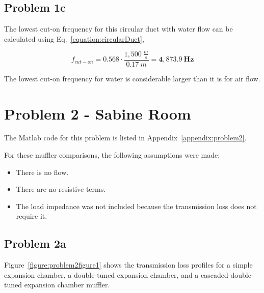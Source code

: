 \vspace{-0.25cm}
\subsection*{Problem 1c}

The lowest cut-on frequency for this circular duct with water flow can be calculated using Eq.~\ref{equation:circularDuct},

\vspace{-0.25cm}
\begin{equation*}
    f_{cut-on} = 0.568 \cdot \frac{ 1,500~\frac{m}{s} }{ 0.17~m } = \boldsymbol{4,873.9~Hz}
\end{equation*}

\vspace{0.25cm}
The lowest cut-on frequency for water is considerable larger than it is for air flow.









\newpage
\section*{Problem 2 - Sabine Room}

The Matlab code for this problem is listed in Appendix~\ref{appendix:problem2}.

\vspace{0.25cm}
For these muffler comparisons, the following assumptions were made:

\begin{itemize}
  \item There is no flow.
  \item There are no resistive terms.
  \item The load impedance was not included because the transmission loss does not require it.
\end{itemize}


\vspace{-0.25cm}
\subsection*{Problem 2a}

\vspace{0.25cm}
Figure~\ref{figure:problem2figure1} shows the transmission loss profiles for a simple expansion chamber, a double-tuned expansion chamber, and a cascaded double-tuned expansion chamber muffler.

